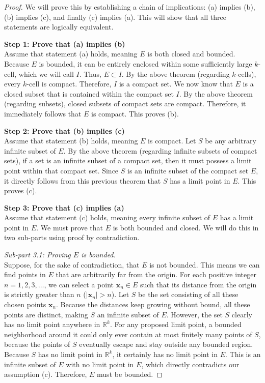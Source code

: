 \documentclass{article}
\theoremstyle{mythm}
\begin{document}
\begin{proof}
We will prove this by establishing a chain of implications: (a) implies (b), (b) implies (c), and finally (c) implies (a). This will show that all three statements are logically equivalent.

\textbf{Step 1: Prove that (a) implies (b)} \\
Assume that statement (a) holds, meaning $E$ is both closed and bounded.
Because $E$ is bounded, it can be entirely enclosed within some sufficiently large $k$-cell, which we will call $I$. Thus, $E \subset I$.
By the above theorem (regarding $k$-cells), every $k$-cell is compact. Therefore, $I$ is a compact set.
We now know that $E$ is a closed subset that is contained within the compact set $I$. 
By the above theorem (regarding subsets), closed subsets of compact sets are compact. Therefore, it immediately follows that $E$ is compact. This proves (b).

\textbf{Step 2: Prove that (b) implies (c)} \\
Assume that statement (b) holds, meaning $E$ is compact. 
Let $S$ be any arbitrary infinite subset of $E$. 
By the above theorem (regarding infinite subsets of compact sets), if a set is an infinite subset of a compact set, then it must possess a limit point within that compact set. 
Since $S$ is an infinite subset of the compact set $E$, it directly follows from this previous theorem that $S$ has a limit point in $E$. This proves (c).

\textbf{Step 3: Prove that (c) implies (a)} \\
Assume that statement (c) holds, meaning every infinite subset of $E$ has a limit point in $E$. We must prove that $E$ is both bounded and closed. We will do this in two sub-parts using proof by contradiction.

\textit{Sub-part 3.1: Proving $E$ is bounded.} \\
Suppose, for the sake of contradiction, that $E$ is not bounded. 
This means we can find points in $E$ that are arbitrarily far from the origin. For each positive integer $n = 1, 2, 3, \dots$, we can select a point $\mathbf{x}_n \in E$ such that its distance from the origin is strictly greater than $n$ ($|\mathbf{x}_n| > n$).
Let $S$ be the set consisting of all these chosen points $\mathbf{x}_n$. Because the distances keep growing without bound, all these points are distinct, making $S$ an infinite subset of $E$.
However, the set $S$ clearly has no limit point anywhere in $\mathbb{R}^k$. For any proposed limit point, a bounded neighborhood around it could only ever contain at most finitely many points of $S$, because the points of $S$ eventually escape and stay outside any bounded region. 
Because $S$ has no limit point in $\mathbb{R}^k$, it certainly has no limit point in $E$. This is an infinite subset of $E$ with no limit point in $E$, which directly contradicts our assumption (c). 
Therefore, $E$ must be bounded.


\end{proof}
\end{document}
